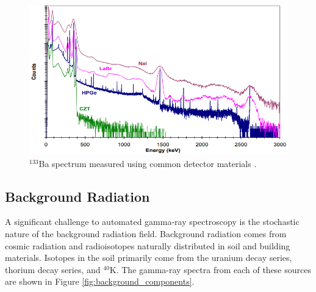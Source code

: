 \begin{figure}[H]
\centering
\includegraphics[width=0.99\linewidth]{images/Ba133_spectrum_different_detector_materials_Market_Survey_Report}
\caption{$^{133}$Ba spectrum measured using common detector materials \cite{RIIDMarketSurveyReport}.}
\label{fig:Ba133_spectrum_different_detector_materials_Market_Survey_Report}
\end{figure}


\subsection{Background Radiation}



A significant challenge to automated gamma-ray spectroscopy is the stochastic nature of the background radiation field. Background radiation comes from cosmic radiation and radioisotopes naturally distributed in soil and building materials. Isotopes in the soil primarily come from the uranium decay series, thorium  decay series, and $^{40}$K. The gamma-ray spectra from each of these sources are shown in Figure \ref{fig:background_components}. 

